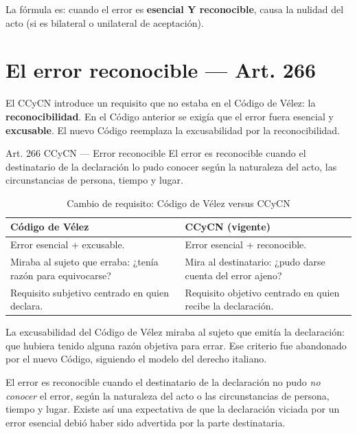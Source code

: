 \documentclass[12pt,oneside]{book}
\begin{document}
La fórmula es: cuando el error es \textbf{esencial Y reconocible}, causa la nulidad del acto (si es bilateral o unilateral de aceptación).

\section{El error reconocible --- Art. 266}

El CCyCN introduce un requisito que no estaba en el Código de Vélez: la \textbf{reconocibilidad}. En el Código anterior se exigía que el error fuera esencial y \textbf{excusable}. El nuevo Código reemplaza la excusabilidad por la reconocibilidad.

\begin{articulo}{Art. 266 CCyCN --- Error reconocible}
El error es reconocible cuando el destinatario de la declaración lo pudo conocer según la naturaleza del acto, las circunstancias de persona, tiempo y lugar.
\end{articulo}

\begin{table}[H]
\centering
\begin{tabularx}{\textwidth}{>{\raggedright\arraybackslash}X >{\raggedright\arraybackslash}X}
\toprule
\textbf{Código de Vélez} & \textbf{CCyCN (vigente)} \\
\midrule
Error esencial + excusable. & Error esencial + reconocible. \\[4pt]
Miraba al sujeto que erraba: ¿tenía razón para equivocarse? & Mira al destinatario: ¿pudo darse cuenta del error ajeno? \\[4pt]
Requisito subjetivo centrado en quien declara. & Requisito objetivo centrado en quien recibe la declaración. \\
\bottomrule
\end{tabularx}
\caption{Cambio de requisito: Código de Vélez versus CCyCN}
\end{table}

La excusabilidad del Código de Vélez miraba al sujeto que emitía la declaración: que hubiera tenido alguna razón objetiva para errar. Ese criterio fue abandonado por el nuevo Código, siguiendo el modelo del derecho italiano.

El error es reconocible cuando el destinatario de la declaración no pudo \textit{no conocer} el error, según la naturaleza del acto o las circunstancias de persona, tiempo y lugar. Existe así una expectativa de que la declaración viciada por un error esencial debió haber sido advertida por la parte destinataria.
\end{document}

